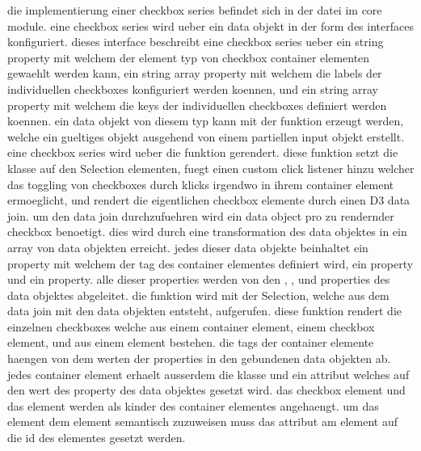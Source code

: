 die implementierung einer checkbox series befindet sich in der  datei im core module.
eine checkbox series wird ueber ein data objekt in der form des  interfaces konfiguriert.
dieses interface beschreibt eine checkbox series ueber ein  string property mit welchem der element typ von checkbox container elementen gewaehlt werden kann, ein  string array property mit welchem die labels der individuellen checkboxes konfiguriert werden koennen, und ein  string array property mit welchem die keys der individuellen checkboxes definiert werden koennen.
ein data objekt von diesem typ kann mit der  funktion erzeugt werden, welche ein gueltiges objekt ausgehend von einem partiellen input objekt erstellt.
eine checkbox series wird ueber die  funktion gerendert.
diese funktion setzt die  klasse auf den Selection elementen, fuegt einen custom click listener hinzu welcher das toggling von checkboxes durch klicks irgendwo in ihrem container element ermoeglicht, und rendert die eigentlichen checkbox elemente durch einen D3 data join.
um den data join durchzufuehren wird ein data object pro zu rendernder checkbox benoetigt.
dies wird durch eine transformation des  data objektes in ein array von  data objekten erreicht.
jedes dieser  data objekte beinhaltet ein  property mit welchem der tag des container elementes definiert wird, ein  property und ein  property. 
alle dieser properties werden von den , , und  properties des  data objektes abgeleitet.
die  funktion wird mit der Selection, welche aus dem data join mit den  data objekten entsteht, aufgerufen.
diese funktion rendert die einzelnen checkboxes welche aus einem container element, einem  checkbox element, und aus einem  element bestehen.
die tags der container elemente haengen von dem werten der  properties in den gebundenen data objekten ab.
jedes container element erhaelt ausserdem die  klasse und ein  attribut welches auf den wert des  property des data objektes gesetzt wird.
das checkbox  element und das  element werden als kinder des container elementes angehaengt.
um das  element dem  element semantisch zuzuweisen muss das  attribut am  element auf die id des  elementes gesetzt werden.
